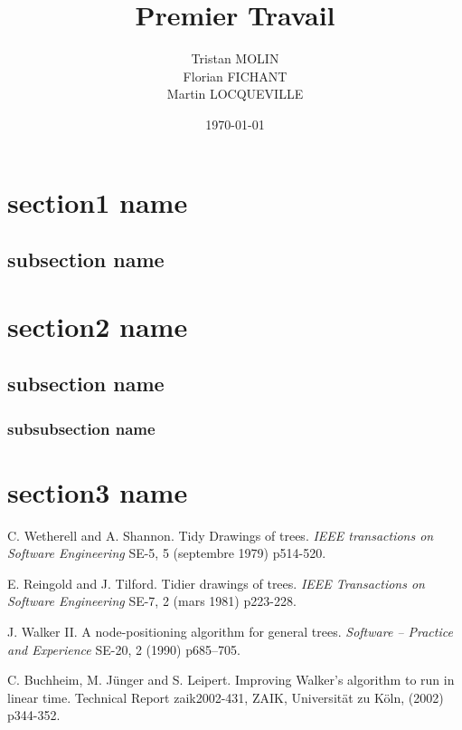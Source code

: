 \documentclass{article}
\title{Premier Travail}
\author{Tristan MOLIN\\Florian FICHANT\\Martin LOCQUEVILLE}
\date{\today}
\begin{document}
\maketitle

\tableofcontents

\newpage

\mainmatter

\section{section1 name}
\subsection{subsection name}

\newpage
\section{section2 name}
\subsection{subsection name}
\subsubsection{subsubsection name}

\newpage
\section{section3 name}






\newpage
\medskip

\begin{thebibliography}{10}

C. Wetherell and A. Shannon. Tidy Drawings of trees. \textit{IEEE transactions on Software Engineering} SE-5, 5 (septembre 1979) p514-520.

E. Reingold and J. Tilford. Tidier drawings of trees. \textit{IEEE Transactions on Software Engineering} SE-7, 2 (mars 1981) p223-228.

J. Walker II. A node-positioning algorithm for general trees. \textit{Software – Practice and Experience} SE-20, 2 (1990) p685–705.

C. Buchheim, M. Jünger and S. Leipert. Improving Walker’s algorithm to run in linear time. Technical Report zaik2002-431, ZAIK, Universität zu Köln, (2002) p344-352.

\end{thebibliography}
\end{document}
